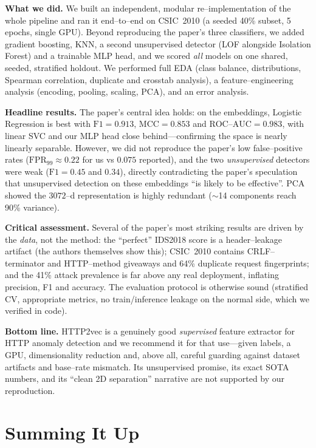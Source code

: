 \documentclass[11pt,a4paper]{article}
\begin{document}
\textbf{What we did.} We built an independent, modular re--implementation of the whole
pipeline and ran it end--to--end on CSIC~2010 (a seeded 40\% subset, 5 epochs, single GPU).
Beyond reproducing the paper's three classifiers, we added gradient boosting, KNN, a
second unsupervised detector (LOF alongside Isolation Forest) and a trainable MLP head, and
we scored \emph{all} models on one shared, seeded, stratified holdout. We performed full
EDA (class balance, distributions, Spearman correlation, duplicate and crosstab analysis),
a feature--engineering analysis (encoding, pooling, scaling, PCA), and an error analysis.

\textbf{Headline results.} The paper's central idea holds: on the embeddings, Logistic
Regression is best with $\text{F1}=0.913$, $\text{MCC}=0.853$ and $\text{ROC--AUC}=0.983$,
with linear SVC and our MLP head close behind---confirming the space is nearly linearly
separable. However, we did not reproduce the paper's low false--positive rates
($\text{FPR}_{99}\approx0.22$ for us vs $0.075$ reported), and the two \emph{unsupervised}
detectors were weak ($\text{F1}=0.45$ and $0.34$), directly contradicting the paper's
speculation that unsupervised detection on these embeddings ``is likely to be effective''.
PCA showed the $3072$--d representation is highly redundant ($\sim$14 components reach 90\%
variance).

\textbf{Critical assessment.} Several of the paper's most striking results are driven by
the \emph{data}, not the method: the ``perfect'' IDS2018 score is a header--leakage
artifact (the authors themselves show this); CSIC~2010 contains CRLF--terminator and
HTTP--method giveaways and 64\% duplicate request fingerprints; and the 41\% attack
prevalence is far above any real deployment, inflating precision, F1 and accuracy. The
evaluation protocol is otherwise sound (stratified CV, appropriate metrics, no
train/inference leakage on the normal side, which we verified in code).

\textbf{Bottom line.} HTTP2vec is a genuinely good \emph{supervised} feature extractor for
HTTP anomaly detection and we recommend it for that use---given labels, a GPU, dimensionality
reduction and, above all, careful guarding against dataset artifacts and base--rate
mismatch. Its unsupervised promise, its exact SOTA numbers, and its ``clean 2D
separation'' narrative are not supported by our reproduction.

\section{Summing It Up}
\label{sec:summing}
\end{document}
